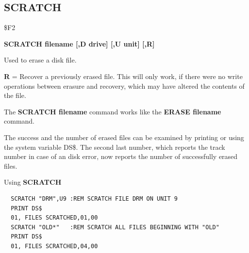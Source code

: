 \subsection{SCRATCH}
\begin{description}[leftmargin=2cm,style=nextline]
\item [Token:] \$F2
\item [Format:] {\bf SCRATCH filename [,D drive] [,U unit] [,R]}
\item [Usage:] Used to erase a disk file.

   \filenamedefinition

   \drivedefinition

   \unitdefinition

   {\bf R} = Recover a previously erased file.
   This will only work, if there were no write operations
   between erasure and recovery, which may have altered the
   contents of the file.

\item [Remarks:] The {\bf SCRATCH filename} command works like the
                 {\bf ERASE filename} command.

                 The success and the number of erased files can
                 be examined by printing or using the system
                 variable DS\$. The second last number, which
                 reports the track number in case of an disk error,
                 now reports the number of successfully erased files.

\item [Example:] Using {\bf SCRATCH}
\begin{tcolorbox}[colback=black,coltext=white]
\verbatimfont{\codefont}
\begin{verbatim}
  SCRATCH "DRM",U9 :REM SCRATCH FILE DRM ON UNIT 9
  PRINT DS$
  01, FILES SCRATCHED,01,00
  SCRATCH "OLD*"   :REM SCRATCH ALL FILES BEGINNING WITH "OLD"
  PRINT DS$
  01, FILES SCRATCHED,04,00
\end{verbatim}
\end{tcolorbox}
\end{description}


\newpage
